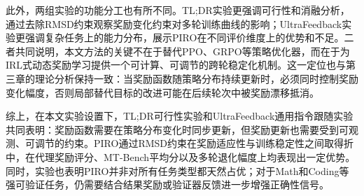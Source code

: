 此外，两组实验的功能分工也有所不同。TL;DR实验更强调可行性和消融分析，通过去除RMSD约束观察奖励变化约束对多轮训练曲线的影响；UltraFeedback实验更强调复杂任务上的能力分布，展示PIRO在不同评价维度上的优势和不足。二者共同说明，本文方法的关键不在于替代PPO、GRPO等策略优化器，而在于为IRL式动态奖励学习提供一个可计算、可调节的跨轮稳定化机制。这一定位也与第三章的理论分析保持一致：当奖励函数随策略分布持续更新时，必须同时控制奖励变化幅度，否则局部替代目标的改进可能在后续轮次中被奖励漂移抵消。

综上，在本文实验设置下，TL;DR可行性实验和UltraFeedback通用指令跟随实验共同表明：奖励函数需要在策略分布变化时同步更新，但奖励更新也需要受到可观测、可调节的约束。PIRO通过RMSD约束在奖励适应性与训练稳定性之间取得折中，在代理奖励评分、MT-Bench平均分以及多轮退化幅度上均表现出一定优势。同时，实验也表明PIRO并非对所有任务类型都天然占优；对于Math和Coding等强可验证任务，仍需要结合结果奖励或验证器反馈进一步增强正确性信号。

